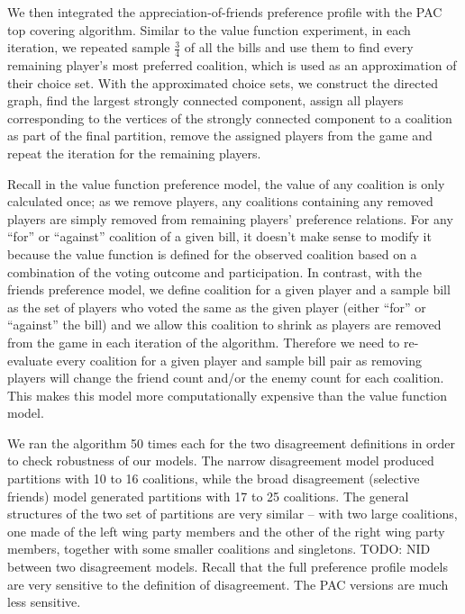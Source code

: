 \documentclass[letterpaper]{article} %
\theoremstyle{definition}
\begin{document}
We then integrated the appreciation-of-friends preference profile with the PAC top covering algorithm. Similar to the value function experiment, in each iteration, we repeated sample $\frac{3}{4}$ of all the bills and use them to find every remaining player's most preferred coalition, which is used as an approximation of their choice set. With the approximated choice sets, we construct the directed graph, find the largest strongly connected component, assign all players corresponding to the vertices of the strongly connected component to a coalition as part of the final partition, remove the assigned players from the game and repeat the iteration for the remaining players.

Recall in the value function preference model, the value of any coalition is only calculated once; as we remove players, any coalitions containing any removed players are simply removed from remaining players' preference relations. For any ``for'' or ``against'' coalition of a given bill, it doesn't make sense to modify it because the value function is defined for the observed coalition based on a combination of the voting outcome and participation. In contrast, with the friends preference model, we define coalition for a given player and a sample bill as the set of players who voted the same as the given player (either ``for'' or ``against'' the bill) and we allow this coalition to shrink as players are removed from the game in each iteration of the algorithm. Therefore we need to re-evaluate every coalition for a given player and sample bill pair as removing players will change the friend count and/or the enemy count for each coalition. This makes this model more computationally expensive than the value function model.

We ran the algorithm 50 times each for the two disagreement definitions in order to check robustness of our models. The narrow disagreement model produced partitions with 10 to 16 coalitions, while the broad disagreement (selective friends) model generated partitions with 17 to 25 coalitions. The general structures of the two set of partitions are very similar – with two large coalitions, one made of the left wing party members and the other of the right wing party members, together with some smaller coalitions and singletons. TODO: NID between two disagreement models. Recall that the full preference profile models are very sensitive to the definition of disagreement. The PAC versions are much less sensitive.
\end{document}
